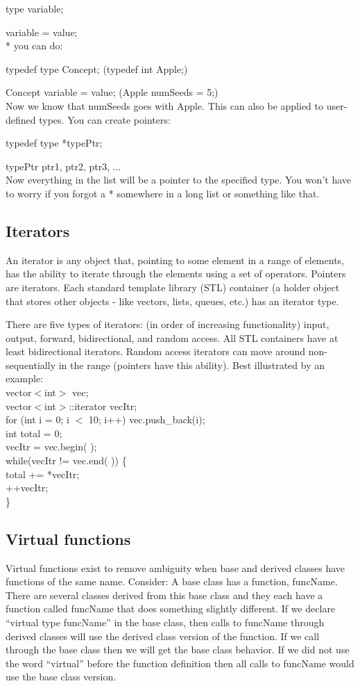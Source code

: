 \documentclass[12pt,twoside]{article}
\begin{document}
type variable; 

variable = value;\\
* you can do: 

typedef type Concept; (typedef int Apple;)

Concept variable = value; (Apple numSeeds = 5;)\\
Now we know that numSeeds goes with Apple. This can also be applied to user-defined types. You can create pointers:

typedef type *typePtr;

typePtr ptr1, ptr2, ptr3, ... \\
Now everything in the list will be a pointer to the specified type. You won't have to worry if you forgot a * somewhere in a long list or something like that. 

\subsection{Iterators}
An iterator is any object that, pointing to some element in a range of elements, has the ability to iterate through the elements using a set of operators. Pointers are iterators. Each standard template library (STL) container (a holder object that stores other objects - like vectors, lists, queues, etc.) has an iterator type. 

There are five types of iterators: (in order of increasing functionality) input, output, forward, bidirectional, and random access. All STL containers have at least bidirectional iterators. Random access iterators can move around non-sequentially in the range (pointers have this ability). Best illustrated by an example: \\
vector$<$int$>$ vec; \\
vector$<$int$>$::iterator vecItr; \\
for (int i = 0; i $<$ 10; i++) vec.push\_back(i);\\
int total = 0; \\
vecItr = vec.begin( ); \\
while(vecItr != vec.end( )) \{ \\
total += *vecItr; \\
++vecItr; \\
\}

\subsection{Virtual functions}
Virtual functions exist to remove ambiguity when base and derived classes have functions of the same name. Consider: A base class has a function, funcName. There are several classes derived from this base class and they each have a function called funcName that does something slightly different. If we declare ``virtual type funcName'' in the base class, then calls to funcName through derived classes will use the derived class version of the function. If we call through the base class then we will get the base class behavior. If we did not use the word ``virtual'' before the function definition then all calls to funcName would use the base class version. 
\end{document}
